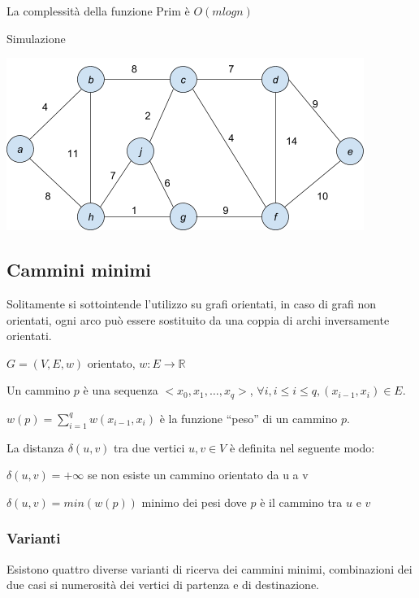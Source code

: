 \documentclass{article}
\begin{document}
{{La complessità della funzione Prim è $O(m logn)$

{Simulazione}

{\includegraphics{images/image542.png}}

\subsection{Cammini minimi}

{Solitamente si sottointende l'utilizzo su grafi orientati, in caso di grafi non orientati, ogni arco può essere sostituito da una coppia di archi inversamente orientati.}

$G=(V,E,w)$ orientato, $w:E\rightarrow \mathbb{R}$

Un cammino $p$ è una sequenza $<x_0,x_1,\ldots,x_q>$, $\forall i, i\leq i \leq q, (x_{i-1},x_i) \in E$.

$w(p)=\sum_{i=1}^{q} w(x_{i-1},x_i)$ è la funzione ``peso'' di un cammino $p$.

{La distanza $\delta(u,v)$ tra due vertici $u,v \in V$ è definita nel seguente modo:}

{$\delta(u,v) = +\infty$ se non esiste un cammino orientato da u a v}

{$\delta(u,v)=min(w(p))$ minimo dei pesi dove $p$ è il cammino tra $u$ e $v$}

\subsubsection{Varianti}

{Esistono quattro diverse varianti di ricerva dei cammini minimi, combinazioni dei due casi si numerosità dei vertici di partenza e di destinazione.}

}}
\end{document}
